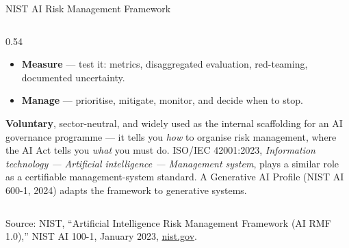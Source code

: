 \begin{frame}{NIST AI Risk Management Framework}
\begin{columns}[c]
\begin{column}{0.54\textwidth}
\begin{itemize}
                      what is the system actually for.
                \item \textbf{Measure} --- test it: metrics, disaggregated evaluation, red-teaming,
                      documented uncertainty.
                \item \textbf{Manage} --- prioritise, mitigate, monitor, and decide when to stop.
            \end{itemize}
            \vspace{0.5em}
            {\scriptsize \textbf{Voluntary}, sector-neutral, and widely used as the internal
            scaffolding for an AI governance programme --- it tells you \emph{how} to organise risk
            management, where the AI Act tells you \emph{what} you must do. ISO/IEC 42001:2023,
            \emph{Information technology --- Artificial intelligence --- Management system}, plays
            a similar role as a certifiable management-system standard. A Generative AI Profile
            (NIST AI 600-1, 2024) adapts the framework to generative systems.}
        \end{column}
    \end{columns}

    \vspace{0.6em}
    {\scriptsize Source: NIST, ``Artificial Intelligence Risk Management Framework (AI RMF 1.0),''
    NIST AI 100-1, January 2023,
    \href{https://www.nist.gov/itl/ai-risk-management-framework}{nist.gov}.}
\end{frame}

